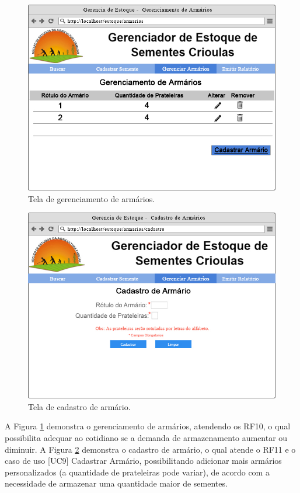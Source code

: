 \documentclass[12pt,a4paper]{article}
\begin{document}
\begin{figure}[H]
\centering %
\includegraphics[width=14cm]{Figuras/gerenciar_armarios.jpg} %
\caption{Tela de gerenciamento de armários.}
\label{figura:Tela_gerencia_armario}
\end{figure}

\begin{figure}[H]
\centering %
\includegraphics[width=14cm]{Figuras/cadastrararmario.jpg} %
\caption{Tela de cadastro de armário.}
\label{figura:Tela_cadastro_armario}
\end{figure}

A Figura \ref{figura:Tela_gerencia_armario} demonstra o gerenciamento de armários, atendendo os RF10, o qual possibilita adequar ao cotidiano se a demanda de armazenamento aumentar ou diminuir. A Figura \ref{figura:Tela_cadastro_armario} demonstra o cadastro de armário, o qual atende o RF11 e o caso de uso [UC9] Cadastrar Armário, possibilitando adicionar mais armários personalizados (a quantidade de prateleiras pode variar), de acordo com a necessidade de armazenar uma quantidade maior de sementes.
\end{document}
